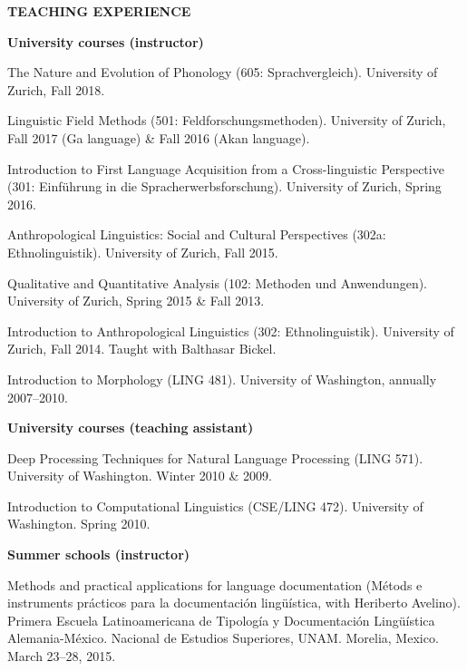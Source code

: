 \documentclass[11pt]{article}
\newcommand{\hangpara}{
 \setlength{\parindent}{0in} %
 \hangindent=0.42in %
}
\begin{document}
\vskip 20pt
\begin{flushleft}
{\bf TEACHING EXPERIENCE}
\end{flushleft}

\begin{flushleft}
{\bf University courses (instructor)}
\end{flushleft}


\hangpara The Nature and Evolution of Phonology (605: Sprachvergleich). University of Zurich, Fall 2018.

\vskip 6pt
\hangpara Linguistic Field Methods (501: Feldforschungsmethoden). University of Zurich, Fall 2017 (Ga language) \& Fall 2016 (Akan language).

\vskip 6pt
\hangpara Introduction to First Language Acquisition from a Cross-linguistic Perspective (301: Einf{\"u}hrung in die Spracherwerbsforschung). University of Zurich, Spring 2016.

\vskip 6pt
\hangpara Anthropological Linguistics: Social and Cultural Perspectives (302a: Ethnolinguistik). University of Zurich, Fall 2015.

\vskip 6pt
\hangpara Qualitative and Quantitative Analysis (102: Methoden und Anwendungen). University of Zurich, Spring 2015 \& Fall 2013.

\vskip 6pt
\hangpara Introduction to Anthropological Linguistics (302: Ethnolinguistik). University of Zurich, Fall 2014. Taught with Balthasar Bickel.

\vskip 6pt
\hangpara Introduction to Morphology (LING 481). University of Washington, annually 2007--2010.

\begin{flushleft}
{\bf University courses (teaching assistant)}
\end{flushleft}
\hangpara Deep Processing Techniques for Natural Language Processing (LING 571). University of Washington. Winter 2010 \& 2009.

\vskip 6pt
\hangpara %
Introduction to Computational Linguistics (CSE/LING 472). University of Washington. Spring 2010.

\begin{flushleft}
{\bf Summer schools (instructor)}
\end{flushleft}
\hangpara Methods and practical applications for language documentation (M{\'e}tods e instruments pr{\'a}cticos para la documentaci{\'o}n ling{\"u}{\'i}stica, with Heriberto Avelino). Primera Escuela Latinoamericana de Tipolog{\'i}a y Documentaci{\'o}n Ling{\"u}{\'i}stica Alemania-M{\'e}xico. Nacional de Estudios Superiores, UNAM. Morelia, Mexico. March 23--28, 2015.
\end{document}
